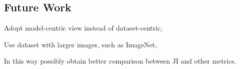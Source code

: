 \documentclass[a4paper]{article}
\begin{document}
{\begin{multicols}{2}
        \section{Future Work}
        \vspace{-0.3cm}
        \begin{compactitem}
            \item Adopt model-centric view instead of dataset-centric,
            \item Use dataset with larger images, such as ImageNet,
            \item In this way possibly obtain better comparison between JI and other metrics.
        \end{compactitem}
    \end{multicols}
}
\end{document}
